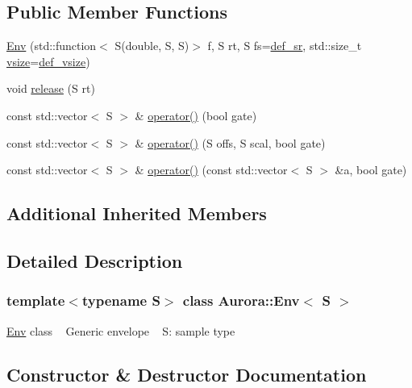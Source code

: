 \subsection*{Public Member Functions}
\begin{DoxyCompactItemize}
\item 
\hyperlink{class_aurora_1_1_env_a2ea7f7db3541bd36853d66423ee74b78}{Env} (std\+::function$<$ S(double, S, S)$>$ f, S rt, S fs=\hyperlink{namespace_aurora_ad49263d809bea98dd422e95bc91bc03e}{def\+\_\+sr}, std\+::size\+\_\+t \hyperlink{class_aurora_1_1_snd_base_af9e21aaf411b17f7a8221c991ce5d291}{vsize}=\hyperlink{namespace_aurora_afaaddf667a06e7ce23c667a8b7295263}{def\+\_\+vsize})
\item 
void \hyperlink{class_aurora_1_1_env_a6591658018e04100709018bc86e94f31}{release} (S rt)
\item 
const std\+::vector$<$ S $>$ \& \hyperlink{class_aurora_1_1_env_a44666f7414faf21c568d20655d5e2761}{operator()} (bool gate)
\item 
const std\+::vector$<$ S $>$ \& \hyperlink{class_aurora_1_1_env_a2cf905d912ec6089b42922a92d4d7d5e}{operator()} (S offs, S scal, bool gate)
\item 
const std\+::vector$<$ S $>$ \& \hyperlink{class_aurora_1_1_env_a2a97a7e7211a8717957fd0f6f8afc81f}{operator()} (const std\+::vector$<$ S $>$ \&a, bool gate)
\end{DoxyCompactItemize}
\subsection*{Additional Inherited Members}


\subsection{Detailed Description}
\subsubsection*{template$<$typename S$>$\newline
class Aurora\+::\+Env$<$ S $>$}

\hyperlink{class_aurora_1_1_env}{Env} class ~\newline
Generic envelope ~\newline
S\+: sample type 

\subsection{Constructor \& Destructor Documentation}
\mbox{\label{class_aurora_1_1_env_a2ea7f7db3541bd36853d66423ee74b78}} 
